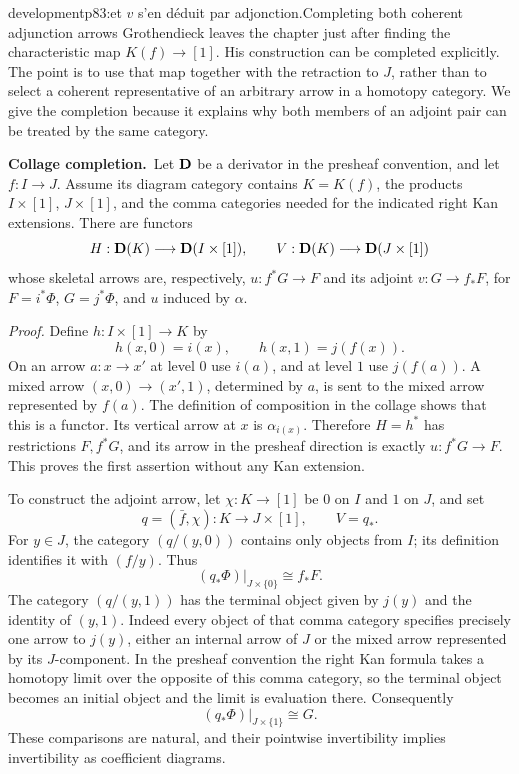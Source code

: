 \begin{dcomment}{development}{p83:et $v$ s'en déduit par adjonction.}{Completing both coherent adjunction arrows}
Grothendieck leaves the chapter just after finding the characteristic map \(K(f)\to[1]\). His construction can be completed explicitly. The point is to use that map together with the retraction to \(J\), rather than to select a coherent representative of an arbitrary arrow in a homotopy category. We give the completion because it explains why both members of an adjoint pair can be treated by the same category.

\textbf{Collage completion.}\ours\
Let \(\mathbf{D}\) be a derivator in the presheaf convention, and let \(f:I\to J\). Assume its diagram category contains \(K=K(f)\), the products \(I\times[1]\), \(J\times[1]\), and the comma categories needed for the indicated right Kan extensions. There are functors
\[
 H:\mathbf{D}(K)\longrightarrow\mathbf{D}(I\times[1]),\qquad
 V:\mathbf{D}(K)\longrightarrow\mathbf{D}(J\times[1])
\]
whose skeletal arrows are, respectively, \(u:f^*G\to F\) and its adjoint \(v:G\to f_*F\), for \(F=i^*\Phi\), \(G=j^*\Phi\), and \(u\) induced by \(\alpha\).

\emph{Proof.}
Define \(h:I\times[1]\to K\) by
\[
 h(x,0)=i(x),\qquad h(x,1)=j(f(x)).
\]
On an arrow \(a:x\to x'\) at level \(0\) use \(i(a)\), and at level \(1\) use \(j(f(a))\). A mixed arrow \((x,0)\to(x',1)\), determined by \(a\), is sent to the mixed arrow represented by \(f(a)\). The definition of composition in the collage shows that this is a functor. Its vertical arrow at \(x\) is \(\alpha_{i(x)}\). Therefore \(H=h^*\) has restrictions \(F,f^*G\), and its arrow in the presheaf direction is exactly \(u:f^*G\to F\). This proves the first assertion without any Kan extension.

To construct the adjoint arrow, let \(\chi:K\to[1]\) be \(0\) on \(I\) and \(1\) on \(J\), and set
\[
 q=(\bar f,\chi):K\longrightarrow J\times[1],
 \qquad V=q_*.
\]
For \(y\in J\), the category \((q/(y,0))\) contains only objects from \(I\); its definition identifies it with \((f/y)\). Thus
\[
 (q_*\Phi)|_{J\times\{0\}}\cong f_*F.
\]
The category \((q/(y,1))\) has the terminal object given by \(j(y)\) and the identity of \((y,1)\). Indeed every object of that comma category specifies precisely one arrow to \(j(y)\), either an internal arrow of \(J\) or the mixed arrow represented by its \(J\)-component. In the presheaf convention the right Kan formula takes a homotopy limit over the opposite of this comma category, so the terminal object becomes an initial object and the limit is evaluation there. Consequently
\[
 (q_*\Phi)|_{J\times\{1\}}\cong G.
\]
These comparisons are natural, and their pointwise invertibility implies invertibility as coefficient diagrams.


\end{dcomment}
